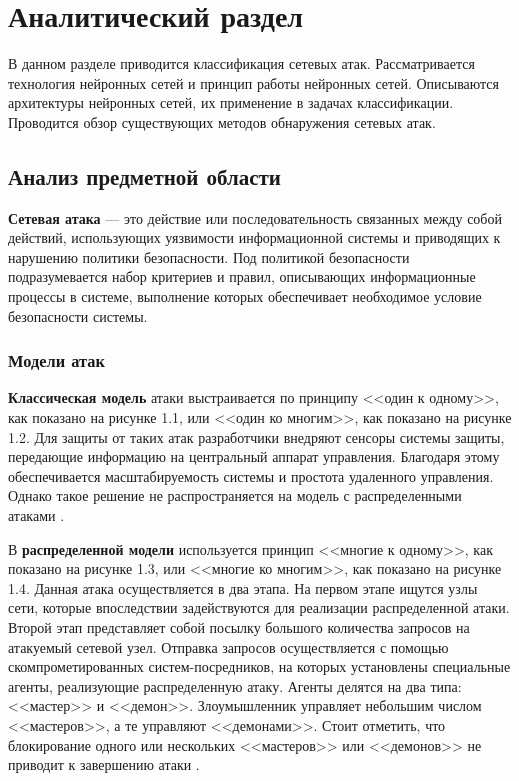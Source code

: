 \chapter{Аналитический раздел}

В данном разделе приводится классификация сетевых атак. 
Рассматривается технология нейронных сетей и принцип работы нейронных сетей. Описываются архитектуры нейронных сетей, их применение в задачах классификации. 
Проводится обзор существующих методов обнаружения сетевых атак.


\section{Анализ предметной области}

\textbf{Сетевая атака} \cite{second} --- это действие или последовательность связанных между собой действий, использующих уязвимости информационной системы и приводящих к нарушению политики безопасности. Под политикой безопасности подразумевается набор критериев и правил, описывающих информационные процессы в системе, выполнение которых обеспечивает необходимое условие безопасности системы.

\subsection{Модели атак}

\textbf{Классическая модель} атаки выстраивается по принципу  <<один к одному>>, как показано на рисунке 1.1, или <<один ко многим>>, как показано на рисунке 1.2. Для защиты от таких атак разработчики внедряют сенсоры системы защиты, передающие информацию на центральный аппарат управления.
Благодаря этому обеспечивается масштабируемость системы и простота удаленного управления. Однако такое решение не распространяется на модель с распределенными атаками \cite{third}.

\clearpage
{}


В \textbf{распределенной модели} используется принцип <<многие к одному>>, как показано на рисунке 1.3, или <<многие ко многим>>, как показано на рисунке 1.4. Данная атака осуществляется в два этапа. На первом этапе ищутся узлы сети, которые впоследствии задействуются для реализации распределенной атаки. Второй этап представляет собой посылку большого количества запросов на атакуемый сетевой узел.
Отправка запросов осу­ществляется с помощью скомпроме­тированных систем-посредников, на которых установлены специальные агенты, реализующие распределенную атаку. Агенты делятся на два типа: <<мастер>> и <<демон>>. Злоумышленник управляет небольшим числом <<мастеров>>, а те управляют <<демонами>>.
Стоит отметить, что блокирование одного или нескольких <<мастеров>> или <<демонов>> не приводит к завершению атаки \cite{third}.

